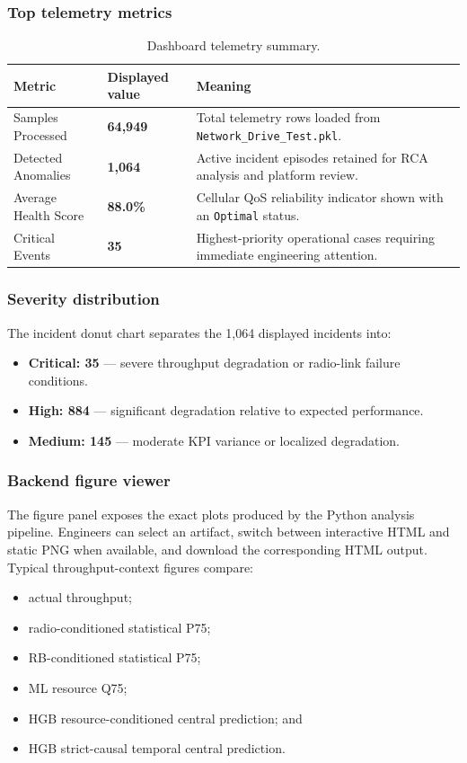 \documentclass[11pt,a4paper]{article}
\begin{document}
\subsubsection{Top telemetry metrics}
\begin{table}[H]
\centering
\small
\begin{tabularx}{0.97\textwidth}{L{3.3cm} L{2.2cm} Y}
\toprule
\textbf{Metric} & \textbf{Displayed value} & \textbf{Meaning} \\
\midrule
Samples Processed & \textbf{64,949} & Total telemetry rows loaded from \texttt{Network\_Drive\_Test.pkl}. \\
Detected Anomalies & \textbf{1,064} & Active incident episodes retained for RCA analysis and platform review. \\
Average Health Score & \textbf{88.0\%} & Cellular QoS reliability indicator shown with an \texttt{Optimal} status. \\
Critical Events & \textbf{35} & Highest-priority operational cases requiring immediate engineering attention. \\
\bottomrule
\end{tabularx}
\caption{Dashboard telemetry summary.}
\label{tab:dash-metrics-ug}
\end{table}

\subsubsection{Severity distribution}
The incident donut chart separates the 1,064 displayed incidents into:
\begin{itemize}
  \item \textbf{Critical: 35} --- severe throughput degradation or radio-link failure conditions.
  \item \textbf{High: 884} --- significant degradation relative to expected performance.
  \item \textbf{Medium: 145} --- moderate KPI variance or localized degradation.
\end{itemize}

\subsubsection{Backend figure viewer}
The figure panel exposes the exact plots produced by the Python analysis pipeline. Engineers can select an artifact, switch between interactive HTML and static PNG when available, and download the corresponding HTML output. Typical throughput-context figures compare:
\begin{itemize}
  \item actual throughput;
  \item radio-conditioned statistical P75;
  \item RB-conditioned statistical P75;
  \item ML resource Q75;
  \item HGB resource-conditioned central prediction; and
  \item HGB strict-causal temporal central prediction.
\end{itemize}
\end{document}
